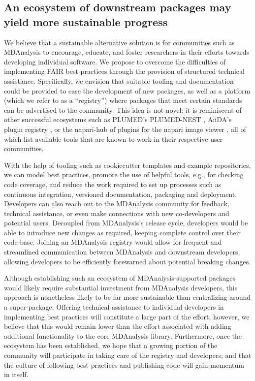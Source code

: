 \documentclass[9pt,whitepaper]{livecoms}
\begin{document}
\subsection{An ecosystem of downstream packages may yield more sustainable progress}
\label{sec:ecosystemadvantages}

We believe that a sustainable alternative solution is for communities such as MDAnalysis to encourage, educate, and foster researchers in their efforts towards developing individual software. We propose to overcome the difficulties of implementing FAIR best practices through the provision of structured technical assistance. Specifically, we envision that suitable tooling and documentation could be provided to ease the development of new packages, as well as a platform (which we refer to as a “registry”) where packages that meet certain standards can be advertised to the community. This idea is not novel; it is reminiscent of other successful ecosystems such as PLUMED’s PLUMED-NEST \cite{bonomi_promoting_2019}, AiiDA’s plugin registry \cite{noauthor_aiida_nodate}, or the napari-hub \cite{chan_zuckerberg_initiative_napari_nodate} of plugins for the napari image viewer \cite{sofroniew_napari_2022}, all of which list available tools that are known to work in their respective user communities.

With the help of tooling such as cookiecutter templates and example repositories, we can model best practices, promote the use of helpful tools, e.g., for checking code coverage, and reduce the work required to set up processes such as continuous integration, versioned documentation, packaging and deployment. Developers can also reach out to the MDAnalysis community for feedback, technical assistance, or even make connections with new co-developers and potential users. Decoupled from MDAnalysis’s release cycle, developers would be able to introduce new changes as required, keeping complete control over their code-base. Joining an MDAnalysis registry would allow for frequent and streamlined communication between MDAnalysis and downstream developers, allowing developers to be efficiently forewarned about potential breaking changes.

Although establishing such an ecosystem of MDAnalysis-supported packages would likely require substantial investment from MDAnalysis developers, this approach is nonetheless likely to be far more sustainable than centralizing around a super-package. Offering technical assistance to individual developers in implementing best practices will constitute a large part of the effort; however, we believe that this would remain lower than the effort associated with adding additional functionality to the core MDAnalysis library. Furthermore, once the ecosystem has been established, we hope that a growing portion of the community will participate in taking care of the registry and developers; and that the culture of following best practices and publishing code will gain momentum in itself. 
\end{document}
